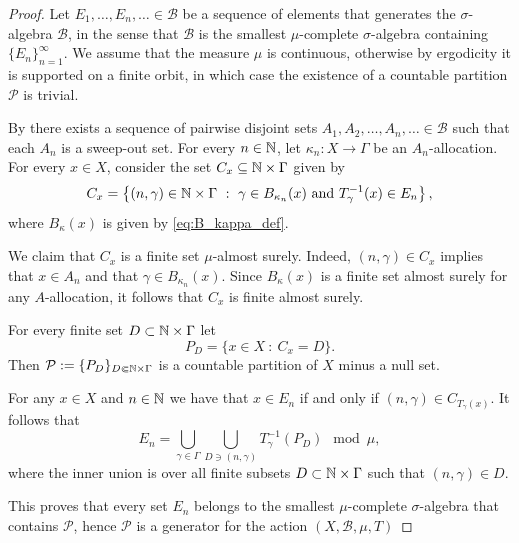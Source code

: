 \documentclass[12pt,reqno]{amsart}
\begin{document}
\begin{proof}
    Let $E_1,\ldots,E_n,\ldots \in \mathcal{B}$ be a sequence of elements that generates the $\sigma$-algebra $\mathcal{B}$, in the sense that $\mathcal{B}$ is the smallest $\mu$-complete   $\sigma$-algebra containing $\{E_n\}_{n=1}^\infty$.
    We assume that the measure $\mu$ is continuous, otherwise by ergodicity it is supported on a finite orbit, in which case the existence of a countable partition  $\mathcal{P}$   is trivial.
    
    By  there exists a sequence of pairwise disjoint sets $A_1,A_2,\ldots,A_n,\ldots \in \mathcal{B}$ such that each $A_n$ is a sweep-out set.
    For every $n \in \mathbb{N}$, let $\kappa_n:X \to \Gamma$ be an $A_n$-allocation.
    For every $x \in X$, 
    consider the set $C_x \subseteq \mathbb{N} \times \Gamma $ given by
    \[
    C_x = \left\{ (n,\gamma) \in \mathbb{N} \times \Gamma  ~:~ \gamma \in B_{\kappa_n}(x) \mbox{ and } T^{-1}_\gamma(x) \in E_n  \right\},
    \]
    where $B_\kappa(x)$ is given by \eqref{eq:B_kappa_def}.

    We claim that $C_x$ is a finite set $\mu$-almost surely.
    Indeed,  $(n,\gamma) \in C_x$ implies that $x \in A_n$ and that $\gamma \in B_{\kappa_n}(x)$. Since $B_\kappa(x)$ is a finite set almost surely for any $A$-allocation, it follows that $C_x$ is finite almost surely.

    For every finite set $D \subset \mathbb{N} \times \Gamma$ let 
    \[
    P_D = \{ x \in X ~:~ C_x = D\}.
    \]
    Then $\mathcal{P}:= \{P_D\}_{D \Subset \mathbb{N} \times \Gamma}$ is a countable partition of $X$ minus a null set.
    
    For any $x \in X$ and $n \in \mathbb{N}$ we have that
    $x \in E_n$ if and only if $(n,\gamma) \in C_{T_\gamma(x)}$.
    It follows that
    \[
    E_n = \bigcup_{\gamma \in \Gamma} \bigcup_{D \ni (n,\gamma) }T_\gamma^{-1}(P_D) \mod \mu,
    \]
    where the inner union is over all finite subsets $D \subset \mathbb{N} \times \Gamma$ such that $(n,\gamma) \in D$.

    This proves that every set $E_n$ belongs to the smallest $\mu$-complete $\sigma$-algebra that contains $\mathcal{P}$, hence $\mathcal{P}$ is a generator for the action $(X,\mathcal{B},\mu,T)$
    
    
\end{proof}
\end{document}
